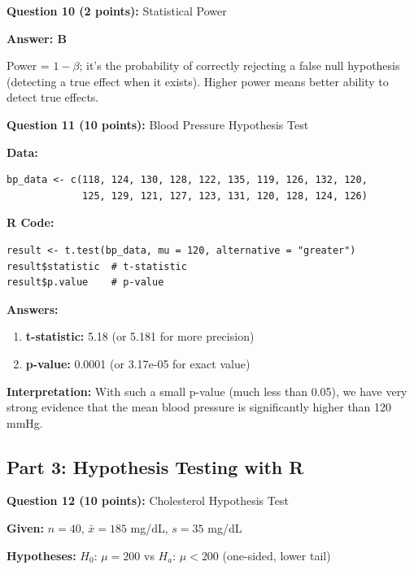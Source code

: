 \documentclass[11pt]{article}
\begin{document}
\vspace{0.5cm}

\textbf{Question 10 (2 points):} Statistical Power

\textcolor{correctgreen}{\textbf{Answer: B}}

Power = $1 - \beta$; it's the probability of correctly rejecting a false null hypothesis (detecting a true effect when it exists). Higher power means better ability to detect true effects.

\vspace{0.5cm}

\textbf{Question 11 (10 points):} Blood Pressure Hypothesis Test

\textbf{Data:}
\begin{verbatim}
bp_data <- c(118, 124, 130, 128, 122, 135, 119, 126, 132, 120,
             125, 129, 121, 127, 123, 131, 120, 128, 124, 126)
\end{verbatim}

\textbf{R Code:}
\begin{verbatim}
result <- t.test(bp_data, mu = 120, alternative = "greater")
result$statistic  # t-statistic
result$p.value    # p-value
\end{verbatim}

\textcolor{correctgreen}{\textbf{Answers:}}
\begin{enumerate}[label=\alph*)]
\item \textbf{t-statistic:} \textcolor{correctgreen}{5.18} (or 5.181 for more precision)
\item \textbf{p-value:} \textcolor{correctgreen}{0.0001} (or 3.17e-05 for exact value)
\end{enumerate}

\textbf{Interpretation:} With such a small p-value (much less than 0.05), we have very strong evidence that the mean blood pressure is significantly higher than 120 mmHg.

\newpage

\subsection*{Part 3: Hypothesis Testing with R}

\textbf{Question 12 (10 points):} Cholesterol Hypothesis Test

\textbf{Given:} $n = 40$, $\bar{x} = 185$ mg/dL, $s = 35$ mg/dL

\textbf{Hypotheses:} $H_0$: $\mu = 200$ vs $H_a$: $\mu < 200$ (one-sided, lower tail)
\end{document}
